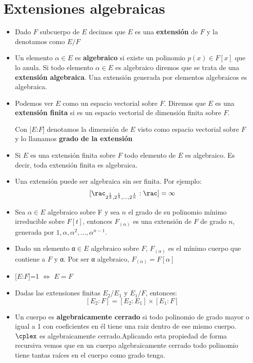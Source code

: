 
\section{Extensiones algebraicas}
\begin{itemize}
\item Dado $F$ subcuerpo de $E$ decimos que $E$ es una \textbf{extensión} de $F$ y la denotamos como $E/F$

\item Un elemento $α\in E$ es \textbf{algebraico} si existe un polinomio $p(x) \in F[x]$ que lo anula. Si todo elemento $α \in E$ es algebraico diremos que se trata de una \textbf{extensión algebraica}. Una extensión generada por elementos algebraicos es algebraica.

\item Podemos ver $E$ como un espacio vectorial sobre $F$. Diremos que $E$ es una \textbf{extensión finita} si es un espacio vectorial de dimensión finita sobre $F$.

Con [$E$:$F$] denotamos la dimensión de $E$ visto como espacio vectorial sobre $F$ y lo llamamos \textbf{grado de la extensión}

\item Si $E$ es una extensión finita sobre $F$ todo elemento de $E$ es algebraico. Es decir, toda extensión finita es algebraica.

\item Una extensión puede ser algebraica sin ser finita. Por ejemplo:
\[[\rac_{2^{\frac{1}{2}}, 2^{\frac{1}{3}}, ..., 2^{\frac{1}{n}}}:\rac] = \infty\]

\item Sea $α\in E$ algebraico sobre F y sea $n$ el grado de su polinomio mínimo irreducible sobre $F[t]$, entonces $F_{(α)}$ es una extensión de $F$ de grado $n$, generada por $1, α, α^2, ..., α^{n-1}$.

\item Dado un elemento α$\in E$ algebraico sobre $F$, $F_{(α)}$ es el mínimo cuerpo que contiene a $F$ y α. Por ser α algebraico, $F_{(α)}=F[α]$

\item $[E$:$F]$=1 $\iff$ $E=F$

\item Dadas las extensiones finitas $E_2$/$E_1$ y $E_1/F$, entonces:
\[[E_2:F]=[E_2:E_1]\times [E_1:F]\]

\item Un cuerpo es \textbf{algebraicamente cerrado} si todo polinomio de grado mayor o igual a 1 con coeficientes en él tiene una raiz dentro de ese mismo cuerpo. $\cplex$ es algebraicamente cerrado.Aplicando esta propiedad de forma recursiva vemos que en un cuerpo algebraicamente cerrado todo polinomio tiene tantas raíces en el cuerpo como grado tenga.


\end{itemize}
